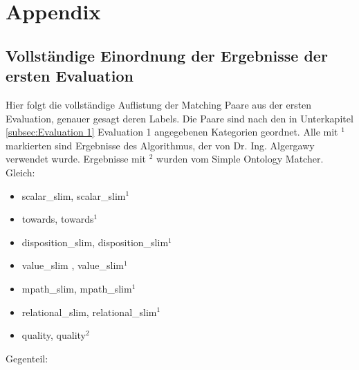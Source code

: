 %

\chapter{Appendix}
\label{ch:Appendix}

\section{Vollständige Einordnung der Ergebnisse der ersten Evaluation}
\label{app:first_appendix}
Hier folgt die vollständige Auflistung der Matching Paare aus der ersten
Evaluation, genauer gesagt deren Labels. Die Paare sind nach den in
Unterkapitel \ref{subsec:Evaluation 1} Evaluation 1 angegebenen Kategorien
geordnet. Alle mit $^1$ markierten sind Ergebnisse des Algorithmus, der von Dr. Ing. Algergawy verwendet wurde. Ergebnisse mit $^2$
wurden vom Simple Ontology Matcher.\\
Gleich:
\begin{itemize}
  \item scalar_slim, scalar_slim$^1$
  \item towards, towards$^1$
  \item disposition_slim, disposition_slim$^1$
  \item value_slim , value_slim$^1$
  \item mpath_slim, mpath_slim$^1$
  \item relational_slim, relational_slim$^1$
  \item quality, quality$^2$
\end{itemize}
Gegenteil:
